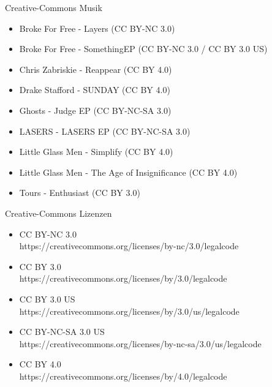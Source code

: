 \begin{frame}{Creative-Commons Musik}
	\scriptsize {
		\begin{itemize}
			\item Broke For Free - Layers (CC BY-NC 3.0)
			\item Broke For Free - SomethingEP (CC BY-NC 3.0 / CC BY 3.0 US)
			\item Chris Zabriskie - Reappear (CC BY 4.0)
			\item Drake Stafford - SUNDAY (CC BY 4.0)
			\item Ghosts - Judge EP (CC BY-NC-SA 3.0)
			\item LASERS - LASERS EP (CC BY-NC-SA 3.0)
			\item Little Glass Men - Simplify (CC BY 4.0)
			\item Little Glass Men - The Age of Insignificance (CC BY 4.0)
			\item Tours - Enthusiast (CC BY 3.0)
		\end{itemize}
	}
\end{frame}

\begin{frame}{Creative-Commons Lizenzen}
	\scriptsize {
		\begin{itemize}	
			\item CC BY-NC 3.0\\
			https://creativecommons.org/licenses/by-nc/3.0/legalcode
			
			\item CC BY 3.0\\
			https://creativecommons.org/licenses/by/3.0/legalcode
			
			\item CC BY 3.0 US\\
			https://creativecommons.org/licenses/by/3.0/us/legalcode
			
			\item CC BY-NC-SA 3.0 US\\
			https://creativecommons.org/licenses/by-nc-sa/3.0/us/legalcode
			
			\item CC BY 4.0\\
			https://creativecommons.org/licenses/by/4.0/legalcode
	\end{itemize}
	}
\end{frame}

